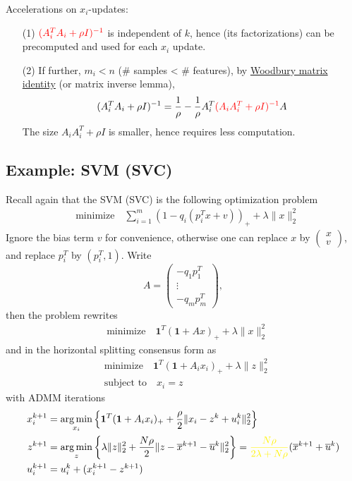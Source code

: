 Accelerations on $x_i$-updates:
\begin{itemize}
    \item[(1)] $\color{red} (A_i^TA_i + \rho I)^{-1}$ is independent of $k$, hence (its factorizations) can be precomputed and used for each $x_i$ update.
    \item[(2)] If further, $m_i < n$ (\# samples < \# features), by \href{https://en.wikipedia.org/wiki/Woodbury_matrix_identity}{Woodbury matrix identity} (or matrix inverse lemma),
    $$(A_i^TA_i + \rho I)^{-1} = \dfrac{1}{\rho} - \dfrac{1}{\rho} A_i^T {\color{red} (A_iA_i^T + \rho I)^{-1}} A$$
    The size $A_iA_i^T + \rho I$ is smaller, hence requires less computation.
\end{itemize}

\subsection{Example: SVM (SVC)}

Recall again that the SVM (SVC) is the following optimization problem
\begin{align*}
    & \text{minimize} \quad \sum\limits_{i=1}^m (1 - q_i( p_i^Tx + v))_+ + \lambda \lVert x \rVert_2^2
\end{align*}
Ignore the bias term $v$ for convenience, otherwise one can replace $x$ by $\begin{pmatrix} x \\ v \end{pmatrix}$, and replace $p_i^T$ by $(p_i^T, 1)$. Write
$$A = \begin{pmatrix} -q_1p_1^T \\ \vdots \\ -q_mp_m^T \end{pmatrix},$$
then the problem rewrites
\begin{align*}
    & \text{minimize} \quad  \mathbf{1}^T (\mathbf{1} + Ax)_+ + \lambda \lVert x \rVert_2^2
\end{align*}
and in the horizontal splitting consensus form as
\begin{align*}
    & \text{minimize} \quad \mathbf{1}^T (\mathbf{1} + A_ix_i)_+ + \lambda \lVert z \rVert_2^2 \\
    & \text{subject to} \quad x_i = z
\end{align*}
with ADMM iterations
\begin{align*}
    x_i^{k+1} & = \argmin_{x_i} \left\{ \mathbf{1}^T (\mathbf{1} + A_ix_i)_+ + \dfrac{\rho}{2} \lVert x_i - z^k + u_i^k \rVert_2^2 \right\} \\
    z^{k+1} & = \argmin_z \left\{ \lambda \lVert z \rVert_2^2 + \dfrac{N\rho}{2} \lVert z - \overline{x}^{k+1} - \overline{u}^k \rVert_2^2 \right\} = {\color{yellow} \dfrac{N\rho}{2\lambda + N\rho}} (\overline{x}^{k+1} + \overline{u}^k) \\
    u_i^{k+1} & = u_i^k + (x_i^{k+1} - z^{k+1})
\end{align*}

